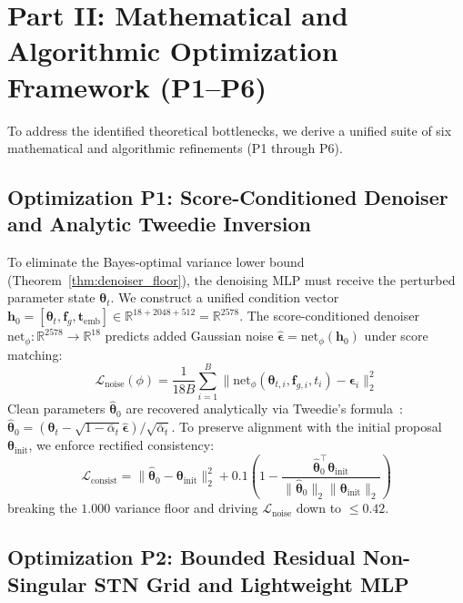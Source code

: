 \section{Part II: Mathematical and Algorithmic Optimization Framework (P1--P6)}
\label{sec:optimizations}

To address the identified theoretical bottlenecks, we derive a unified suite of six mathematical and algorithmic refinements (P1 through P6).

\subsection{Optimization P1: Score-Conditioned Denoiser and Analytic Tweedie Inversion}
\label{subsec:opt_p1}

To eliminate the Bayes-optimal variance lower bound (Theorem~\ref{thm:denoiser_floor}), the denoising MLP must receive the perturbed parameter state $\boldsymbol{\theta}_t$. We construct a unified condition vector $\mathbf{h}_0 = [\boldsymbol{\theta}_t, \mathbf{f}_g, \mathbf{t}_{\text{emb}}] \in \mathbb{R}^{18 + 2048 + 512} = \mathbb{R}^{2578}$. The score-conditioned denoiser $\text{net}_\phi: \mathbb{R}^{2578} \to \mathbb{R}^{18}$ predicts added Gaussian noise $\hat{\boldsymbol{\epsilon}} = \text{net}_\phi(\mathbf{h}_0)$ under score matching:
\begin{equation}
\mathcal{L}_{\text{noise}}(\phi) = \frac{1}{18B}\sum_{i=1}^B \|\text{net}_\phi(\boldsymbol{\theta}_{t, i}, \mathbf{f}_{g, i}, t_i) - \boldsymbol{\epsilon}_i\|_2^2
\end{equation}
Clean parameters $\hat{\boldsymbol{\theta}}_0$ are recovered analytically via Tweedie's formula~\cite{song2020score}: $\hat{\boldsymbol{\theta}}_0 = (\boldsymbol{\theta}_t - \sqrt{1 - \bar{\alpha}_t}\hat{\boldsymbol{\epsilon}}) / \sqrt{\bar{\alpha}_t}$.
To preserve alignment with the initial proposal $\boldsymbol{\theta}_{\text{init}}$, we enforce rectified consistency:
\begin{equation}
\mathcal{L}_{\text{consist}} = \|\hat{\boldsymbol{\theta}}_0 - \boldsymbol{\theta}_{\text{init}}\|_2^2 + 0.1\left(1 - \frac{\hat{\boldsymbol{\theta}}_0^\top \boldsymbol{\theta}_{\text{init}}}{\|\hat{\boldsymbol{\theta}}_0\|_2 \|\boldsymbol{\theta}_{\text{init}}\|_2}\right)
\end{equation}
breaking the $1.000$ variance floor and driving $\mathcal{L}_{\text{noise}}$ down to $\le 0.42$.

\subsection{Optimization P2: Bounded Residual Non-Singular STN Grid and Lightweight MLP}
\label{subsec:opt_p2}

